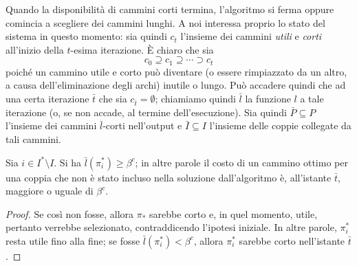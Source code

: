 Quando la disponibilità di cammini corti termina, l'algoritmo si ferma
oppure comincia a scegliere dei cammini lunghi. A noi interessa proprio lo
stato del sistema in questo momento: sia quindi $c_t$ l'insieme dei cammini
\textit{utili} e \textit{corti} all'inizio della $t$-esima
iterazione. \`E chiaro che sia
$$
	c_0 \supseteq c_1 \supseteq \cdots \supset c_{t}
$$
poiché un cammino utile e corto può diventare (o essere rimpiazzato da
un altro, a causa dell'eliminazione degli archi) inutile o lungo.
Può accadere quindi che ad una certa iterazione $\bar{t}$ che sia $c_{\bar{t}} = \emptyset$;
chiamiamo quindi $\bar{l}$ la funzione $l$ a tale iterazione (o, se non accade,
al termine dell'esecuzione). Sia quindi $\bar{P} \subseteq P$ l'insieme dei cammini $\bar{l}$-corti
nell'output e $\bar{I} \subseteq I$ l'insieme delle coppie collegate da tali cammini.

\begin{lemma}\label{lem:priceddpaths_non_included_non_short}
	Sia $i \in I^* \setminus I$. Si ha $\bar{l}(\pi_{i}^*) \geq \beta^c$; in altre
	parole il costo di un cammino ottimo per una coppia che non è stato incluso
	nella soluzione dall'algoritmo è, all'istante $\bar{t}$, maggiore o uguale
	di $\beta^c$.
\end{lemma}
\begin{proof}
	Se così non fosse, allora $\pi_*$ sarebbe corto e, in quel momento, utile,
	pertanto verrebbe selezionato, contraddicendo l'ipotesi iniziale.
	In altre parole, $\pi_{i}^*$ resta utile fino alla fine;
	se fosse $\bar{l}(\pi_i^*) < \beta^c$, allora $\pi_i^*$ sarebbe corto nell'istante $\bar{t}$.
\end{proof}


